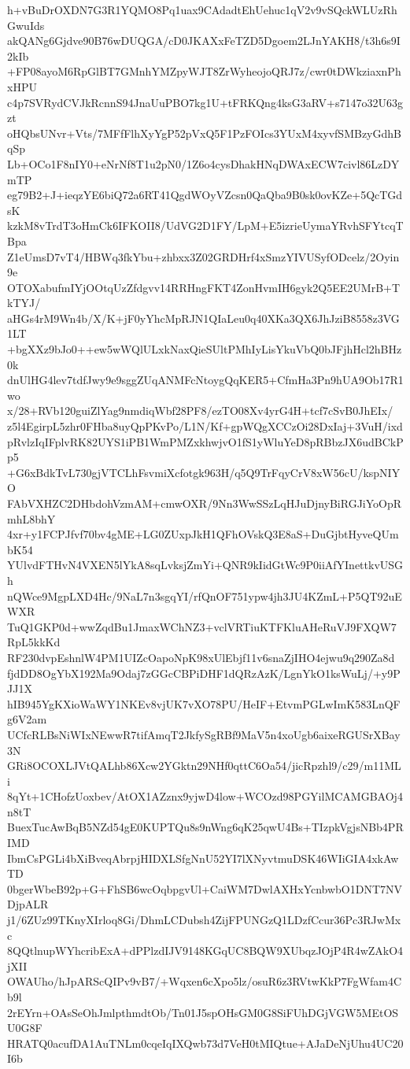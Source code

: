 h+vBuDrOXDN7G3R1YQMO8Pq1uax9CAdadtEhUehuc1qV2v9vSQckWLUzRhGwuIds
akQANg6Gjdve90B76wDUQGA/cD0JKAXxFeTZD5Dgoem2LJnYAKH8/t3h6s9I2kIb
+FP08ayoM6RpGlBT7GMnhYMZpyWJT8ZrWyheojoQRJ7z/cwr0tDWkziaxnPhxHPU
c4p7SVRydCVJkRcnnS94JnaUuPBO7kg1U+tFRKQng4ksG3aRV+s7147o32U63gzt
oHQbsUNvr+Vts/7MFfFlhXyYgP52pVxQ5F1PzFOIcs3YUxM4xyvfSMBzyGdhBqSp
Lb+OCo1F8nIY0+eNrNf8T1u2pN0/1Z6o4cysDhakHNqDWAxECW7civl86LzDYmTP
eg79B2+J+ieqzYE6biQ72a6RT41QgdWOyVZcsn0QaQba9B0sk0ovKZe+5QcTGdsK
kzkM8vTrdT3oHmCk6IFKOII8/UdVG2D1FY/LpM+E5izrieUymaYRvhSFYtcqTBpa
Z1eUmsD7vT4/HBWq3fkYbu+zhbxx3Z02GRDHrf4xSmzYIVUSyfODcelz/2Oyin9e
OTOXabufmIYjOOtqUzZfdgvv14RRHngFKT4ZonHvmIH6gyk2Q5EE2UMrB+TkTYJ/
aHGs4rM9Wn4b/X/K+jF0yYhcMpRJN1QIaLeu0q40XKa3QX6JhJziB8558z3VG1LT
+bgXXz9bJo0++ew5wWQlULxkNaxQieSUltPMhIyLisYkuVbQ0bJFjhHcl2hBHz0k
dnUlHG4lev7tdfJwy9e9sggZUqANMFcNtoygQqKER5+CfmHa3Pn9hUA9Ob17R1wo
x/28+RVb120guiZlYag9nmdiqWbf28PF8/ezTO08Xv4yrG4H+tcf7cSvB0JhEIx/
z5l4EgirpL5zhr0FHba8uyQpPKvPo/L1N/Kf+gpWQgXCCzOi28DxIaj+3VuH/ixd
pRvlzIqIFplvRK82UYS1iPB1WmPMZxkhwjvO1fS1yWluYeD8pRBbzJX6udBCkPp5
+G6xBdkTvL730gjVTCLhFsvmiXcfotgk963H/q5Q9TrFqyCrV8xW56cU/kspNIYO
FAbVXHZC2DHbdohVzmAM+cmwOXR/9Nn3WwSSzLqHJuDjnyBiRGJiYoOpRmhL8bhY
4xr+y1FCPJfvf70bv4gME+LG0ZUxpJkH1QFhOVskQ3E8aS+DuGjbtHyveQUmbK54
YUlvdFTHvN4VXEN5lYkA8sqLvksjZmYi+QNR9kIidGtWc9P0iiAfYInettkvUSGh
nQWce9MgpLXD4Hc/9NaL7n3sgqYI/rfQnOF751ypw4jh3JU4KZmL+P5QT92uEWXR
TuQ1GKP0d+wwZqdBu1JmaxWChNZ3+vclVRTiuKTFKluAHeRuVJ9FXQW7RpL5kkKd
RF230dvpEshnlW4PM1UIZcOapoNpK98xUlEbjf11v6snaZjIHO4ejwu9q290Za8d
fjdDD8OgYbX192Ma9Odaj7zGGcCBPiDHF1dQRzAzK/LgnYkO1ksWuLj/+y9PJJ1X
hIB945YgKXioWaWY1NKEv8vjUK7vXO78PU/HeIF+EtvmPGLwImK583LnQFg6V2am
UCfcRLBsNiWIxNEwwR7tifAmqT2JkfySgRBf9MaV5n4xoUgb6aixeRGUSrXBay3N
GRi8OCOXLJVtQALhb86Xcw2YGktn29NHf0qttC6Oa54/jicRpzhl9/c29/m11MLi
8qYt+1CHofzUoxbev/AtOX1AZznx9yjwD4low+WCOzd98PGYilMCAMGBAOj4n8tT
BuexTucAwBqB5NZd54gE0KUPTQu8s9nWng6qK25qwU4Bs+TIzpkVgjsNBb4PRIMD
IbmCsPGLi4bXiBveqAbrpjHIDXLSfgNnU52YI7lXNyvtmuDSK46WIiGIA4xkAwTD
0bgerWbeB92p+G+FhSB6wcOqbpgvUl+CaiWM7DwlAXHxYcnbwbO1DNT7NVDjpALR
j1/6ZUz99TKnyXIrloq8Gi/DhmLCDubsh4ZijFPUNGzQ1LDzfCcur36Pc3RJwMxc
8QQtlnupWYhcribExA+dPPlzdIJV9148KGqUC8BQW9XUbqzJOjP4R4wZAkO4jXII
OWAUho/hJpARScQIPv9vB7/+Wqxen6cXpo5lz/osuR6z3RVtwKkP7FgWfam4Cb9l
2rEYrn+OAsSeOhJmlpthmdtOb/Tn01J5spOHsGM0G8SiFUhDGjVGW5MEtOSU0G8F
HRATQ0acufDA1AuTNLm0cqeIqIXQwb73d7VeH0tMIQtue+AJaDeNjUhu4UC20I6b
